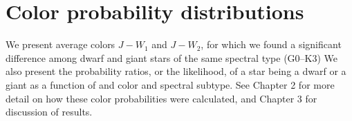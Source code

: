 \chapter{Color probability distributions}\label{Appendix:3}
We present average colors $J-W_{1}$ and $J-W_{2}$, for which we found a significant difference among dwarf and giant stars of the same spectral type (G0--K3) We also present the probability ratios, or the likelihood, of a star being a dwarf or a giant as a function of \jwone and \jwtwo color and spectral subtype. See Chapter 2 for more detail on how these color probabilities were calculated, and Chapter 3 for discussion of results.



